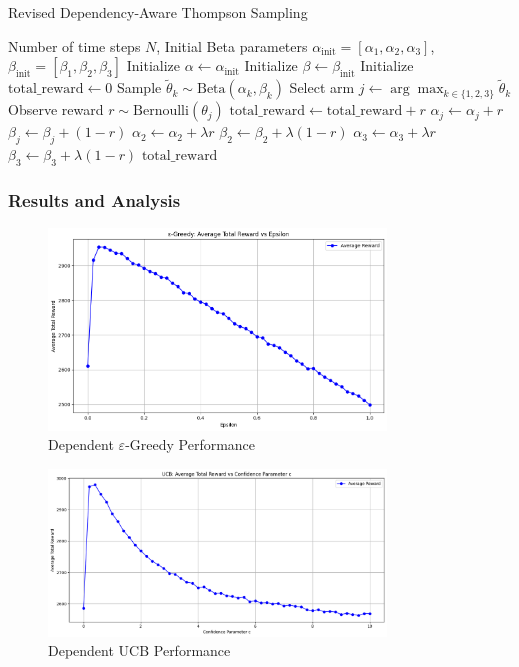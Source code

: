 \documentclass[11pt]{article}
\begin{document}
\newpage
\begin{algorithm}
\caption{Revised Dependency-Aware Thompson Sampling}
\begin{algorithmic}[1]
\Require Number of time steps $N$, Initial Beta parameters $\alpha_{\text{init}} = [\alpha_1, \alpha_2, \alpha_3]$, $\beta_{\text{init}} = [\beta_1, \beta_2, \beta_3]$
\State Initialize $\alpha \gets \alpha_{\text{init}}$
\State Initialize $\beta \gets \beta_{\text{init}}$
\State Initialize $ \text{total\_reward} \gets 0 $
        \State Sample $\tilde{\theta}_k \sim \text{Beta}(\alpha_k, \beta_k)$
    \EndFor
    \State Select arm $j \gets \arg\max_{k \in \{1,2,3\}} \tilde{\theta}_k$
    \State Observe reward $r \sim \text{Bernoulli}(\theta_j)$
    \State $\text{total\_reward} \gets \text{total\_reward} + r$
    \State $\alpha_j \gets \alpha_j + r$
    \State $\beta_j \gets \beta_j + (1-r)$
        \State $\alpha_2 \gets \alpha_2 + \lambda r$
        \State $\beta_2 \gets \beta_2 + \lambda(1-r)$
        \State $\alpha_3 \gets \alpha_3 + \lambda r$
        \State $\beta_3 \gets \beta_3 + \lambda(1-r)$
    \EndIf
\EndFor
\State \Return $\text{total\_reward}$
\end{algorithmic}
\end{algorithm}


\newpage
\subsubsection*{Results and Analysis}
\begin{figure}[H]
    \centering
    \includegraphics[width=0.8\textwidth]{pics/greedy_dependence.png}
    \caption{Dependent \(\varepsilon\)-Greedy Performance}
    \label{fig:dep_greedy}
\end{figure}

\begin{figure}[H]
    \centering
    \includegraphics[width=0.8\textwidth]{pics/ucb_dependence.png}
    \caption{Dependent UCB Performance}
    \label{fig:dep_ucb}
\end{figure}
\end{document}
